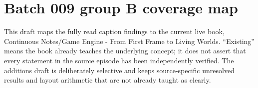 \section{Batch 009 group B coverage map}\label{appendix-877738f6f4d2-batch-009-group-b-coverage-map}

\hypertarget{appendix-877738f6f4d2-batch-009-group-b-coverage-map}{}

This draft maps the fully read caption findings to the current live book, {Continuous Notes/Game Engine - From First Frame to Living Worlds}. ``Existing'' means the book already teaches the underlying concept; it does not assert that every statement in the source episode has been independently verified. The additions draft is deliberately selective and keeps source-specific unresolved results and layout arithmetic that are not already taught as clearly.

